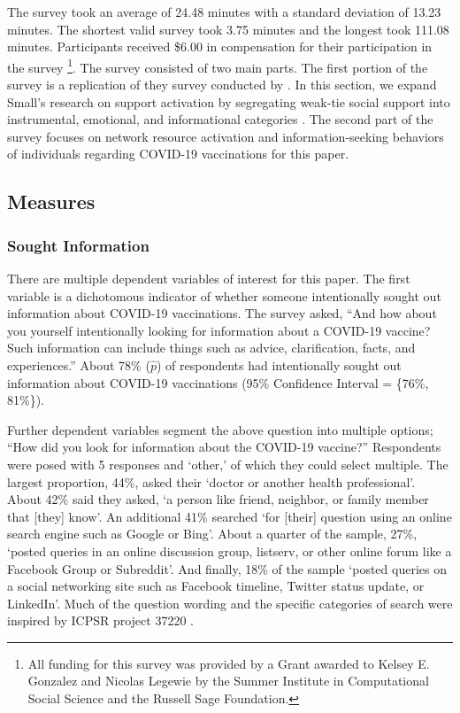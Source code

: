 The survey took an average of 24.48 minutes with a standard deviation of 13.23 minutes.
The shortest valid survey took 3.75 minutes and the longest took 111.08 minutes.
Participants received \$6.00 in compensation for their participation in the survey
\footnote{All funding for this survey was provided by a Grant awarded to Kelsey E. 
Gonzalez and Nicolas Legewie by the Summer Institute in Computational Social Science
and the Russell Sage Foundation.}. The survey consisted of two main parts. The
first portion of the survey is a replication of they survey conducted by 
\citet{smallSomeoneTalk2017}. In this section, we expand Small's research on 
support activation by segregating weak-tie social support into instrumental, 
emotional, and informational categories \citep[see][]{houseStructuresProcessesSocial1988}.
The second part of the survey focuses on network resource activation and 
information-seeking behaviors of individuals regarding COVID-19 vaccinations
for this paper.



\hypertarget{measures}{%
\subsection{Measures}\label{measures}}

\hypertarget{sought-information}{%
\subsubsection{Sought Information}\label{sought-information}}

There are multiple dependent variables of interest for this paper. The first
variable is a dichotomous indicator of whether someone intentionally sought out
information about COVID-19 vaccinations. The survey asked, ``And how about you
yourself intentionally looking for information about a COVID-19 vaccine? Such
information can include things such as advice, clarification, facts, and
experiences.'' About 78\% (\(\widehat{p}\))
of respondents had intentionally sought out information about COVID-19
vaccinations (95\% Confidence Interval = \{76\%, 81\%\}).

Further dependent variables segment the above question into multiple options;
``How did you look for information about the COVID-19 vaccine?'' Respondents were
posed with 5 responses and `other,' of which they could select multiple. The
largest proportion, 44\%, asked their `doctor or another health professional'.
About 42\% said they asked, `a person like friend, neighbor, or family member 
that [they] know'. An additional 41\% searched `for [their] question
using an online search engine such as Google or Bing'. About a quarter of the
sample, 27\%, `posted queries in an online discussion group, listserv, or 
other online forum like a Facebook Group or Subreddit'. And finally, 18\% of 
the sample `posted queries on a social networking site such as Facebook timeline, 
Twitter status update, or LinkedIn'.
Much of the question wording and the specific categories of search were inspired
by ICPSR project 37220 \citep{scanlon19}.


